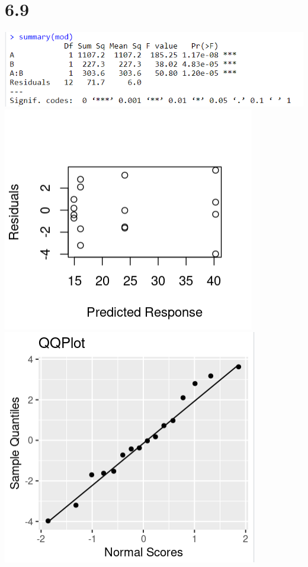 \documentclass{article}
\begin{document}
\section*{6.9}
\includegraphics{6.9a.PNG}
\\\includegraphics{6.9bRes.PNG} \includegraphics{6.9bQQ.PNG}
\end{document}
